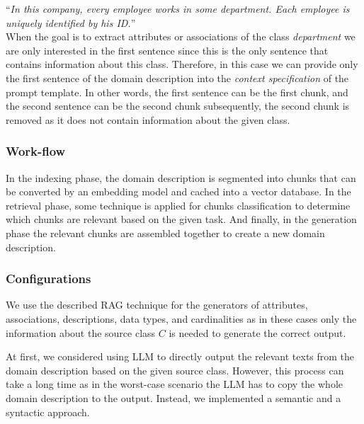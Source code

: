 \noindent{}``\textit{In this company, every employee works in some department. Each employee is uniquely identified by his ID.}''\\

\noindent{}When the goal is to extract attributes or associations of the class \textit{department} we are only interested in the first sentence since this is the only sentence that contains information about this class. Therefore, in this case we can provide only the first sentence of the domain description into the \emph{context specification} of the prompt template. In other words, the first sentence can be the first chunk, and the second sentence can be the second chunk subsequently, the second chunk is removed as it does not contain information about the given class.


\subsubsection{Work-flow}

In the indexing phase, the domain description is segmented into chunks that can be converted by an embedding model and cached into a vector database. In the retrieval phase, some technique is applied for chunks classification to determine which chunks are relevant based on the given task. And finally, in the generation phase the relevant chunks are assembled together to create a new domain description.


\subsubsection{Configurations}
\label{sec:rag_configurations}

We use the described RAG technique for the generators of attributes, associations, descriptions, data types, and cardinalities as in these cases only the information about the source class $C$ is needed to generate the correct output.

At first, we considered using LLM to directly output the relevant texts from the domain description based on the given source class. However, this process can take a long time as in the worst-case scenario the LLM has to copy the whole domain description to the output. Instead, we implemented a semantic and a syntactic approach.



